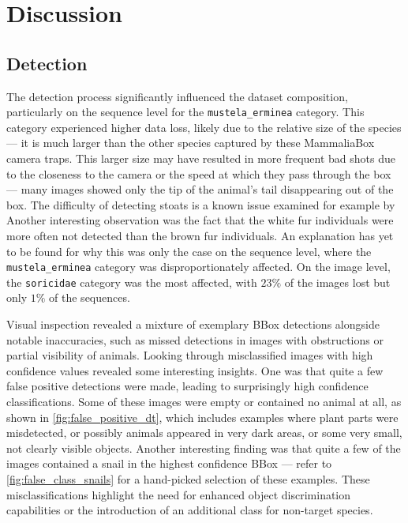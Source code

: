 


\section{Discussion}
\label{discussion}

\subsection{Detection}
The detection process significantly influenced the dataset composition, particularly on the sequence level for the \texttt{mustela\_erminea} category.
This category experienced higher data loss, likely due to the relative size of the species --- it is much larger than the other species captured by these MammaliaBox camera traps.
This larger size may have resulted in more frequent bad shots due to the closeness to the camera or the speed at which they pass through the box --- many images showed only the tip of the animal's tail disappearing out of the box.
The difficulty of detecting stoats is a known issue examined for example by \textcite{crooseAssessingDetectabilityIrish2022} 
Another interesting observation was the fact that the white fur individuals were more often not detected than the brown fur individuals.
An explanation has yet to be found for why this was only the case on the sequence level, where the \texttt{mustela\_erminea} category was disproportionately affected.
On the image level, the \texttt{soricidae} category was the most affected, with \(23\%\) of the images lost but only \(1\%\) of the sequences.

Visual inspection revealed a mixture of exemplary BBox detections alongside notable inaccuracies, such as missed detections in images with obstructions or partial visibility of animals.
Looking through misclassified images with high confidence values revealed some interesting insights.
One was that quite a few false positive detections were made, leading to surprisingly high confidence classifications.
Some of these images were empty or contained no animal at all, as shown in \autoref{fig:false_positive_dt}, which includes examples where plant parts were misdetected, or possibly animals appeared in very dark areas, or some very small, not clearly visible objects.
Another interesting finding was that quite a few of the images contained a snail in the highest confidence BBox --- refer to \autoref{fig:false_class_snails} for a hand-picked selection of these examples.
These misclassifications highlight the need for enhanced object discrimination capabilities or the introduction of an additional class for non-target species.


